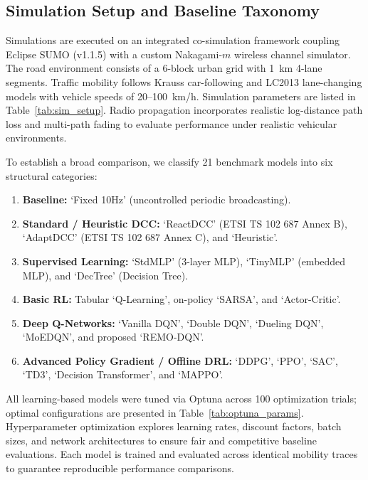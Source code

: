 \documentclass[journal]{IEEEtran}
\begin{document}
\subsection{Simulation Setup and Baseline Taxonomy}
Simulations are executed on an integrated co-simulation framework coupling Eclipse SUMO (v1.1.5) with a custom Nakagami-$m$ wireless channel simulator. The road environment consists of a 6-block urban grid with 1~km 4-lane segments. Traffic mobility follows Krauss car-following and LC2013 lane-changing models with vehicle speeds of 20--100~km/h. Simulation parameters are listed in Table~\ref{tab:sim_setup}. Radio propagation incorporates realistic log-distance path loss and multi-path fading to evaluate performance under realistic vehicular environments.

To establish a broad comparison, we classify 21 benchmark models into six structural categories:
\begin{enumerate}
    \item \textbf{Baseline:} `Fixed 10Hz' (uncontrolled periodic broadcasting).
    \item \textbf{Standard / Heuristic DCC:} `ReactDCC' (ETSI TS 102 687 Annex B), `AdaptDCC' (ETSI TS 102 687 Annex C), and `Heuristic'.
    \item \textbf{Supervised Learning:} `StdMLP' (3-layer MLP), `TinyMLP' (embedded MLP), and `DecTree' (Decision Tree).
    \item \textbf{Basic RL:} Tabular `Q-Learning', on-policy `SARSA', and `Actor-Critic'.
    \item \textbf{Deep Q-Networks:} `Vanilla DQN', `Double DQN', `Dueling DQN', `MoEDQN', and proposed `REMO-DQN'.
    \item \textbf{Advanced Policy Gradient / Offline DRL:} `DDPG', `PPO', `SAC', `TD3', `Decision Transformer', and `MAPPO'.
\end{enumerate}
All learning-based models were tuned via Optuna across 100 optimization trials; optimal configurations are presented in Table~\ref{tab:optuna_params}. Hyperparameter optimization explores learning rates, discount factors, batch sizes, and network architectures to ensure fair and competitive baseline evaluations. Each model is trained and evaluated across identical mobility traces to guarantee reproducible performance comparisons.
\end{document}
